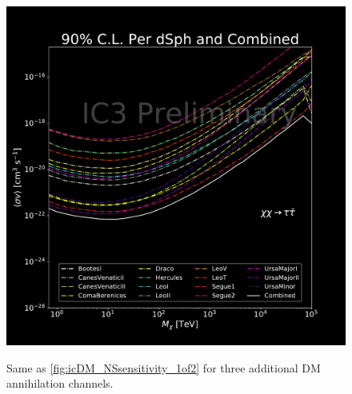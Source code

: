 \begin{figure}[h]
{        \includegraphics[scale=0.3]{figures/ic_DM/dm_plots/tautau_money_plot_comb.pdf}
    }
    \caption{Same as \cref{fig:icDM_NSsensitivity_1of2} for three additional DM annihilation channels.}
    \label{fig:icDM_Nssensitivity_2of2}
\end{figure}